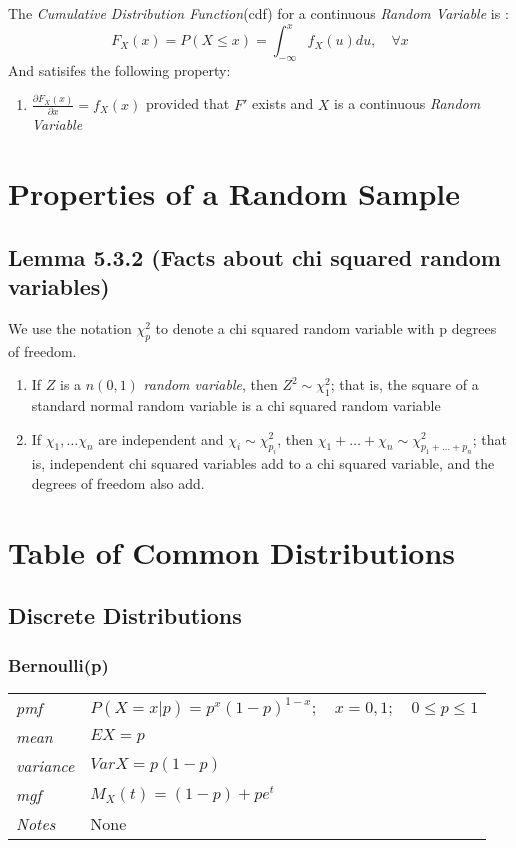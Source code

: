 \documentclass[12pt]{article}
\begin{document}
The \emph{Cumulative Distribution Function}(cdf) for a continuous \emph{Random Variable} is \cite[p.5]{classnotes.4}:
$$F_X(x)=P(X \leq x) = \int_{-\infty}^{x}f_X(u)du, \quad \forall x$$
And satisifes the following property:
\begin{enumerate}
\item $\frac{\partial F_X(x)}{\partial x}=f_X(x)$ provided that $F'$ exists and $X$ is a continuous \emph{Random Variable}
\end{enumerate}

\section*{Properties of a Random Sample}
\subsection*{Lemma 5.3.2 (Facts about chi squared random variables)\cite[p. 219]{StatisticalInference}}
We use the notation $\chi_p^2$ to denote a chi squared random variable with p degrees of freedom. 
\begin{enumerate}
\item If $Z$ is a $n(0, 1)$ \emph{random variable}, then $Z^2\sim\chi_1^2$; that is, the square of a standard normal random variable is a chi squared random variable
\item If $\chi_1,\dots\chi_n$ are independent and $\chi_i\sim\chi_{p_i}^2$, then $\chi_1+\dots+\chi_n\sim\chi_{p_1+\dots+p_n}^2$; that is, independent chi squared variables add to a chi squared variable, and the degrees of freedom also add. 
\end{enumerate}

\section*{Table of Common Distributions}
\subsection*{Discrete Distributions}
\subsubsection*{Bernoulli(p) \cite[p. 621]{StatisticalInference}}
\begin{tabularx}{\textwidth}{ l X }
\emph{pmf} & $P(X=x|p)=p^x(1-p)^{1-x}; \quad x=0, 1; \quad 0 \leq p \leq 1$ \\
\emph{mean} & $EX=p$ \\
\emph{variance} & $Var X =p(1-p)$ \\
\emph{mgf} & $M_X(t)=(1-p)+pe^t$ \\
\emph{Notes} & None\\
\end{tabularx}
\end{document}
